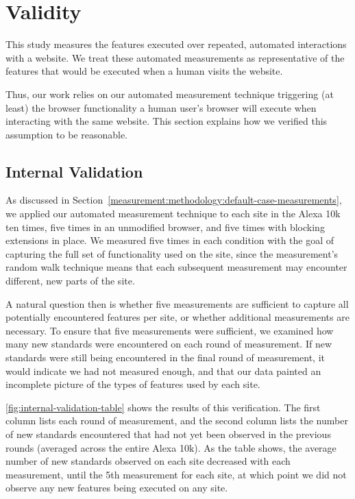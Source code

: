 \section{Validity}
\label{measurement:validity}

This study measures the features executed over repeated,
automated interactions with a website.  We treat these
automated measurements as representative of the features that would be executed
when a human visits the website.

Thus, our work relies on our automated measurement technique
triggering (at least) the browser functionality a human user's browser will
execute when interacting with the same website. This section explains how we
verified this assumption to be reasonable.

\subsection{Internal Validation}
\label{measurement:validity:internal-validation}



As discussed in Section~\ref{measurement:methodology:default-case-measurements}, we applied our automated
measurement technique to each site in the Alexa 10k ten times, five times in
an unmodified browser, and five times with blocking extensions in place.
We measured five times in each condition with the goal of capturing the full
set of functionality used on the site, since the measurement's
random walk technique means that each subsequent measurement may encounter
different, new parts of the site.

A natural question then is whether five measurements are sufficient
to capture all potentially encountered features per site, or whether additional
measurements are necessary.  To ensure that five measurements were
sufficient, we examined how many new standards were encountered on
each round of measurement.  If new standards were still being encountered in the
final round of measurement, it would indicate we had not measured enough,
and that our data painted an incomplete picture of the types of features used
by each site.

\ref{fig:internal-validation-table} shows the results of this verification.
The first column lists each round of measurement, and the second
column lists the number of new standards encountered
that had not yet been observed in the previous rounds (averaged
across the entire Alexa 10k).  As the table shows, the average number of new
standards observed on each site decreased with each measurement,
until the 5th measurement for each site, at which point we did not observe any
new features being executed on any site.

